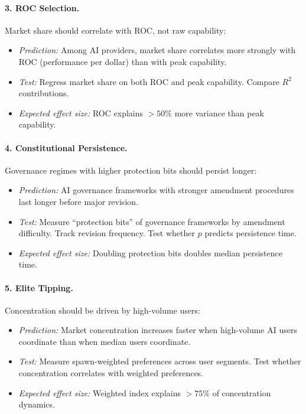 \documentclass[12pt]{article}
\begin{document}
\paragraph{3. ROC Selection.} Market share should correlate with ROC, not raw capability:
\begin{itemize}
    \item \textit{Prediction:} Among AI providers, market share correlates more strongly with ROC (performance per dollar) than with peak capability.
    \item \textit{Test:} Regress market share on both ROC and peak capability. Compare $R^2$ contributions.
    \item \textit{Expected effect size:} ROC explains $>50\%$ more variance than peak capability.
\end{itemize}

\paragraph{4. Constitutional Persistence.} Governance regimes with higher protection bits should persist longer:
\begin{itemize}
    \item \textit{Prediction:} AI governance frameworks with stronger amendment procedures last longer before major revision.
    \item \textit{Test:} Measure ``protection bits'' of governance frameworks by amendment difficulty. Track revision frequency. Test whether $p$ predicts persistence time.
    \item \textit{Expected effect size:} Doubling protection bits doubles median persistence time.
\end{itemize}

\paragraph{5. Elite Tipping.} Concentration should be driven by high-volume users:
\begin{itemize}
    \item \textit{Prediction:} Market concentration increases faster when high-volume AI users coordinate than when median users coordinate.
    \item \textit{Test:} Measure spawn-weighted preferences across user segments. Test whether concentration correlates with weighted preferences.
    \item \textit{Expected effect size:} Weighted index explains $>75\%$ of concentration dynamics.
\end{itemize}
\end{document}
